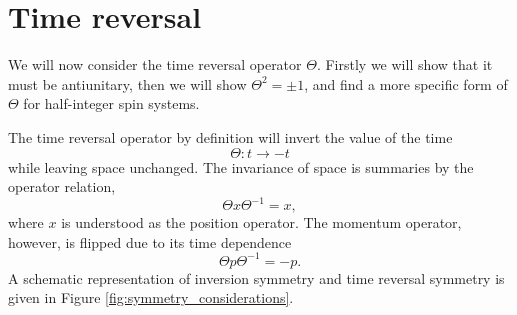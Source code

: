 \section{Time reversal}
We will now consider the time reversal operator $\Theta $.
Firstly we will show that it must be antiunitary, then we will show $\Theta^2 = \pm 1$, and find a more specific form of $\Theta$ for half-integer spin systems.


The time reversal operator by definition will invert the value of the time
$$
\Theta: t \rightarrow -t
$$
while leaving space unchanged.
The invariance of space is summaries by the operator relation,
\begin{equation}
  \label{eq:TRdef}
  \Theta x \Theta^{-1} = x,
\end{equation}
where $x$ is understood as the position operator.
The momentum operator, however, is flipped due to its time dependence
\begin{equation}
  \label{eq:Pdef}
  \Theta p \Theta^{-1} = - p.
\end{equation}
A schematic representation of inversion symmetry and time reversal symmetry is given in Figure \ref{fig:symmetry_considerations}.

